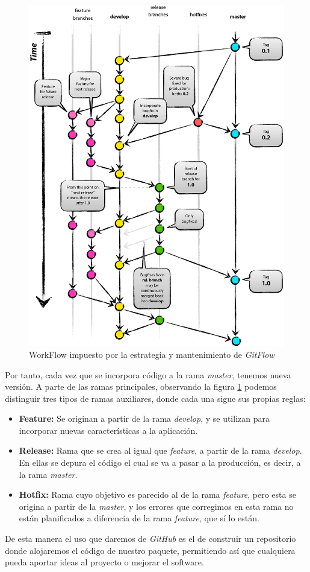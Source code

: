 \documentclass[a4paper, 12pt]{book}
\begin{document}
\begin{figure}[H]
    \centering
    \includegraphics[scale=0.2]{img/git_flow.png}
    \caption{WorkFlow impuesto por la estrategia y mantenimiento de \emph{GitFlow}}
    \label{fig:gitFlow}
\end{figure}
Por tanto, cada vez que se incorpora código a la rama \textit{master}, tenemos nueva versión. A parte de las ramas principales, observando la figura \ref{fig:gitFlow} podemos distinguir tres tipos de ramas auxiliares, donde cada una sigue sus propias reglas:
\begin{itemize}
    \item \textbf{Feature:} Se originan a partir de la rama \textit{develop}, y  se utilizan para incorporar nuevas características a la aplicación.
    \item \textbf{Release:} Rama que se crea al igual que \textit{feature}, a partir de la rama \textit{develop}. En ellas se depura el código el cual se va a pasar a la producción, es decir, a la rama \textit{master}. 
    \item \textbf{Hotfix:} Rama cuyo objetivo es parecido al de la rama \textit{feature}, pero esta se origina a partir de la \emph{master}, y los errores que corregimos en esta rama no están planificados a diferencia de la rama \emph{feature}, que sí lo están. 
\end{itemize}
De esta manera el uso que daremos de \emph{GitHub} es el de construir un repositorio donde alojaremos el código de nuestro paquete, permitiendo así que cualquiera pueda aportar ideas al proyecto o mejorar el software.
\end{document}
